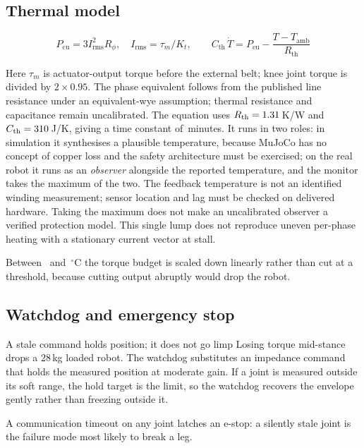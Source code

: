 \documentclass[11pt,a4paper]{article}
\begin{document}
\subsection{Thermal model}

\[
P_{\mathrm{cu}} = 3 I_{\mathrm{rms}}^2 R_{\phi},\quad I_{\mathrm{rms}} = \tau_m/K_t,
\qquad
C_{\mathrm{th}}\,\dot T = P_{\mathrm{cu}} - \frac{T - T_{\mathrm{amb}}}{R_{\mathrm{th}}}
\]

Here $\tau_m$ is actuator-output torque before the external belt; knee joint
torque is divided by $2\times0.95$. The phase equivalent follows from the
published line resistance under an equivalent-wye assumption; thermal resistance
and capacitance remain uncalibrated. The equation uses
$R_{\mathrm{th}} = 1.31$\,K/W and $C_{\mathrm{th}} = 310$\,J/K,
giving a time constant of \RdTauThermal\,minutes. It runs in two roles: in
simulation it synthesises a plausible temperature, because MuJoCo has no concept
of copper loss and the safety architecture must be exercised; on the real robot
it runs as an \emph{observer} alongside the reported temperature, and the
monitor takes the maximum of the two. The feedback
temperature is not an identified winding measurement; sensor location and lag
must be checked on delivered hardware. Taking the maximum does not make an
uncalibrated observer a verified protection model. This single lump does not
reproduce uneven per-phase heating with a stationary current vector at stall.

Between \RdTempDerate\ and \RdTempFault\,$^\circ$C the torque budget is scaled
down linearly rather than cut at a threshold, because cutting output abruptly
would drop the robot.

\subsection{Watchdog and emergency stop}

\begin{decision}{A stale command holds position; it does not go limp}
Losing torque mid-stance drops a 28\,kg loaded robot. The watchdog substitutes an
impedance command that holds the measured position at moderate gain. If a joint
is measured outside its soft range, the hold target is the limit, so the
watchdog recovers the envelope gently rather than freezing outside it.
\end{decision}

A communication timeout on any joint latches an e-stop: a silently stale joint
is the failure mode most likely to break a leg.
\end{document}
